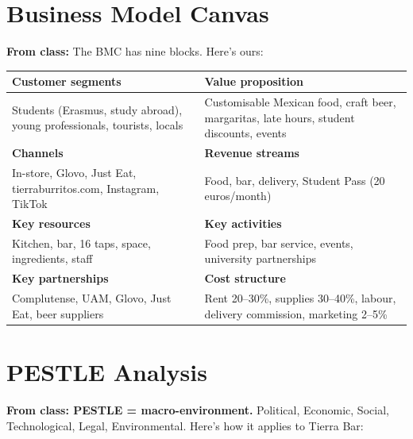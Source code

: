 \documentclass[11pt,a4paper]{article}
\begin{document}
\vspace{1em}

\section{Business Model Canvas}\label{sec:bmc}

\textbf{From class:} The BMC has nine blocks. Here's ours:

\begin{center}
\small
\begin{tabular}{@{}p{5.2cm}p{5.2cm}@{}}
\toprule
\rowcolor{lightorange}
\textbf{Customer segments} & \textbf{Value proposition} \\
\midrule
Students (Erasmus, study abroad), young professionals, tourists, locals & Customisable Mexican food, craft beer, margaritas, late hours, student discounts, events \\
\addlinespace
\rowcolor{lightorange}
\textbf{Channels} & \textbf{Revenue streams} \\
\midrule
In-store, Glovo, Just Eat, tierraburritos.com, Instagram, TikTok & Food, bar, delivery, Student Pass (20 euros/month) \\
\addlinespace
\rowcolor{lightorange}
\textbf{Key resources} & \textbf{Key activities} \\
\midrule
Kitchen, bar, 16 taps, space, ingredients, staff & Food prep, bar service, events, university partnerships \\
\addlinespace
\rowcolor{lightorange}
\textbf{Key partnerships} & \textbf{Cost structure} \\
\midrule
Complutense, UAM, Glovo, Just Eat, beer suppliers & Rent 20--30\%, supplies 30--40\%, labour, delivery commission, marketing 2--5\% \\
\bottomrule
\end{tabular}
\end{center}

\vspace{1em}

\section{PESTLE Analysis}

\textbf{From class: PESTLE = macro-environment.} Political, Economic, Social, Technological, Legal, Environmental. Here's how it applies to Tierra Bar:
\end{document}

